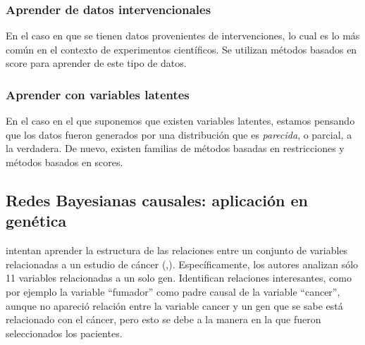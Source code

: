\documentclass[11pt]{article}
\theoremstyle{plain}
\begin{document}
\subsubsection{Aprender de datos intervencionales}
En el caso en que se tienen datos provenientes de intervenciones, lo cual es lo más común en el contexto de experimentos científicos. Se utilizan métodos basados en score para aprender de este tipo de datos.
\subsubsection{Aprender con variables latentes}
En el caso en el que suponemos que existen variables latentes, estamos pensando que los datos fueron generados por una distribución que es \textit{parecida}, o parcial, a la verdadera. De nuevo, existen familias de métodos basadas en restricciones y métodos basados en scores.
\subsection{Redes Bayesianas causales: aplicación en genética}
\cite{su2013using} intentan aprender la estructura de las relaciones entre un conjunto de variables relacionadas a un estudio de cáncer (\cite{karagas1998design},\cite{karagas2004incidence}). Específicamente, los autores analizan sólo 11 variables relacionadas a un solo gen. Identifican relaciones interesantes, como por ejemplo la variable “fumador” como padre causal de la variable “cancer”, aunque no apareció relación entre la variable cancer y un gen que se sabe está relacionado con el cáncer, pero esto se debe a la manera en la que fueron seleccionados los pacientes.
\end{document}

